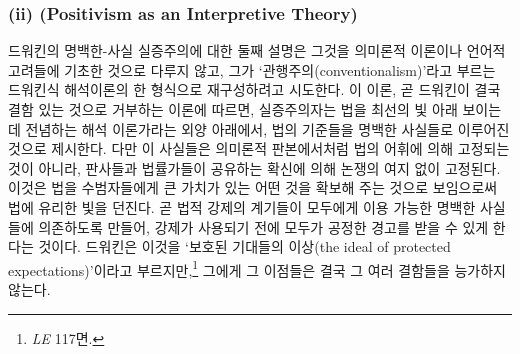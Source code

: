 \subsubsection{\texorpdfstring{(ii) 
(Positivism as an Interpretive
Theory)}{(ii) 해석적 이론으로서의 실증주의 (Positivism as an Interpretive Theory)}}\label{ii-uxd574uxc11duxc801-uxc774uxb860uxc73cuxb85cuxc11cuxc758-uxc2e4uxc99duxc8fcuxc758-positivism-as-an-interpretive-theory}

드워킨의 명백한-사실 실증주의에 대한 둘째 설명은 그것을 의미론적
이론이나 언어적 고려들에 기초한 것으로 다루지 않고, 그가
‘관행주의(conventionalism)’라고 부르는 드워킨식 해석이론의 한 형식으로
재구성하려고 시도한다. 이 이론, 곧 드워킨이 결국 결함 있는 것으로
거부하는 이론에 따르면, 실증주의자는 법을 최선의 빛 아래 보이는 데
전념하는 해석 이론가라는 외양 아래에서, 법의 기준들을 명백한 사실들로
이루어진 것으로 제시한다. 다만 이 사실들은 의미론적 판본에서처럼 법의
어휘에 의해 고정되는 것이 아니라, 판사들과 법률가들이 공유하는 확신에
의해 논쟁의 여지 없이 고정된다. 이것은 법을 수범자들에게 큰 가치가 있는
어떤 것을 확보해 주는 것으로 보임으로써 법에 유리한 빛을 던진다. 곧 법적
강제의 계기들이 모두에게 이용 가능한 명백한 사실들에 의존하도록 만들어,
강제가 사용되기 전에 모두가 공정한 경고를 받을 수 있게 한다는 것이다.
드워킨은 이것을 ‘보호된 기대들의 이상(the ideal of protected
expectations)’이라고 부르지만,\footnote{\emph{LE} 117면.} 그에게 그
이점들은 결국 그 여러 결함들을 능가하지 않는다.

